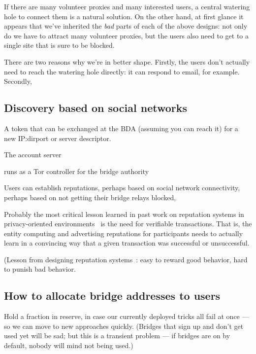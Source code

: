 \documentclass{llncs}
\begin{document}
If there are many volunteer proxies and many interested users, a central
watering hole to connect them is a natural solution. On the other hand,
at first glance it appears that we've inherited the \emph{bad} parts of
each of the above designs: not only do we have to attract many volunteer
proxies, but the users also need to get to a single site that is sure
to be blocked.

There are two reasons why we're in better shape. Firstly, the users don't
actually need to reach the watering hole directly: it can respond to
email, for example. Secondly, 




\subsection{Discovery based on social networks}

A token that can be exchanged at the BDA (assuming you
can reach it) for a new IP:dirport or server descriptor.

The account server

runs as a Tor controller for the bridge authority

Users can establish reputations, perhaps based on social network
connectivity, perhaps based on not getting their bridge relays blocked,

Probably the most critical lesson learned in past work on reputation
systems in privacy-oriented environments~\cite{p2p-econ} is the need for
verifiable transactions. That is, the entity computing and advertising
reputations for participants needs to actually learn in a convincing
way that a given transaction was successful or unsuccessful.

(Lesson from designing reputation systems~\cite{p2p-econ}: easy to
reward good behavior, hard to punish bad behavior.

\subsection{How to allocate bridge addresses to users}

Hold a fraction in reserve, in case our currently deployed tricks
all fail at once --- so we can move to new approaches quickly.
(Bridges that sign up and don't get used yet will be sad; but this
is a transient problem --- if bridges are on by default, nobody will
mind not being used.)
\end{document}
